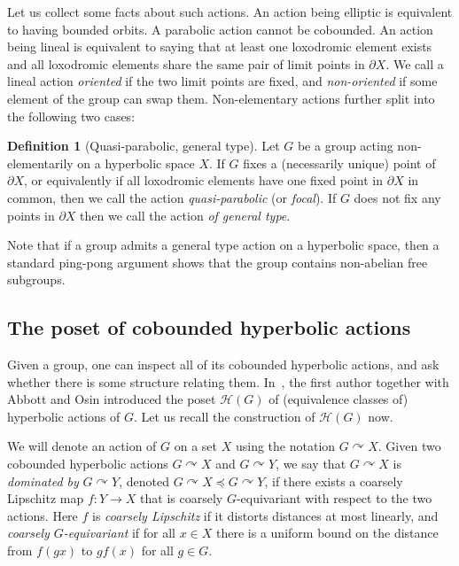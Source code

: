 \documentclass[10pt,a4paper]{article}
\theoremstyle{definition}
\newtheorem{defi}[cdrthm]{Definition}
\theoremstyle{remark}
\newcommand{\Hyp}{\mathcal{H}}
\theoremstyle{plain}
\begin{document}
Let us collect some facts about such actions. An action being elliptic is equivalent to having bounded orbits. A parabolic action cannot be cobounded. An action being lineal is equivalent to saying that at least one loxodromic element exists and all loxodromic elements share the same pair of limit points in $\partial X$. We call a lineal action \emph{oriented} if the two limit points are fixed, and \emph{non-oriented} if some element of the group can swap them. Non-elementary actions further split into the following two cases:

\begin{defi}[Quasi-parabolic, general type]
Let $G$ be a group acting non-elementarily on a hyperbolic space $X$. If $G$ fixes a (necessarily unique) point of $\partial X$, or equivalently if all loxodromic elements have one fixed point in $\partial X$ in common, then we call the action \emph{quasi-parabolic} (or \emph{focal}). If $G$ does not fix any points in $\partial X$ then we call the action \emph{of general type}.
\end{defi}

Note that if a group admits a general type action on a hyperbolic space, then a standard ping-pong argument shows that the group contains non-abelian free subgroups.


\subsection{The poset of cobounded hyperbolic actions}\label{ssec:poset}

Given a group, one can inspect all of its cobounded hyperbolic actions, and ask whether there is some structure relating them. In~\cite{ABO}, the first author together with Abbott and Osin introduced the poset $\Hyp(G)$ of (equivalence classes of) hyperbolic actions of $G$. Let us recall the construction of $\Hyp(G)$ now.

We will denote an action of $G$ on a set $X$ using the notation $G \curvearrowright X$. Given two cobounded hyperbolic actions $G\curvearrowright X$ and $G\curvearrowright Y$, we say that $G\curvearrowright X$ is \emph{dominated by} $G\curvearrowright Y$, denoted $G\curvearrowright X \preceq G\curvearrowright Y$, if there exists a coarsely Lipschitz map $f\colon Y\to X$ that is coarsely $G$-equivariant with respect to the two actions. Here $f$ is \emph{coarsely Lipschitz} if it distorts distances at most linearly, and \emph{coarsely $G$-equivariant} if for all $x\in X$ there is a uniform bound on the distance from $f(gx)$ to $gf(x)$ for all $g\in G$.
\end{document}
